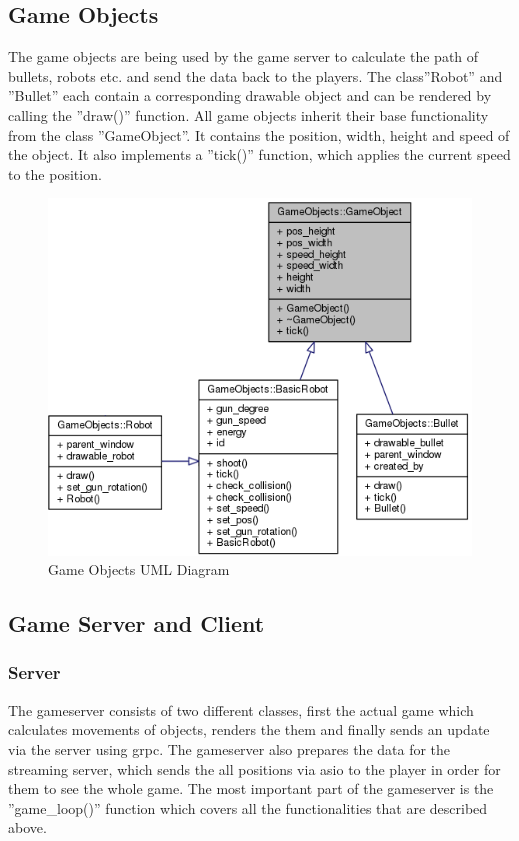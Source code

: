 \documentclass[12pt]{report}
\begin{document}
\subsection{Game Objects}
The game objects are being used by the game server to calculate the path of bullets, robots etc. and send the data back to the players. The class''Robot'' and ''Bullet'' each contain a corresponding drawable object and can be rendered by calling the ''draw()'' function. All game objects inherit their base functionality from the class ''GameObject''. It contains the position, width, height and speed of the object. It also implements a ''tick()'' function, which applies the current speed to the position.

\begin{figure}[h]
\centering
\includegraphics[scale = 0.7]{GameObjects_graph.png}
\caption{Game Objects UML Diagram}
\medskip
\end{figure}

\clearpage

\subsection{Game Server and Client}

\subsubsection{Server}
The gameserver consists of two different classes, first the actual game which calculates movements of objects, renders the them and finally sends an update via the server using grpc. The gameserver also prepares the data for the streaming server, which sends the all positions via asio to the player in order for them to see the whole game. The most important part of the gameserver is the ''game\_loop()'' function which covers all the functionalities that are described above.
\end{document}

